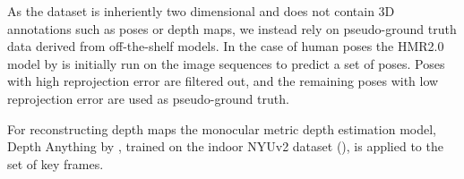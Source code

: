 As the dataset is inheriently two dimensional and does not contain 3D annotations such as poses or depth maps, we instead rely on pseudo-ground truth data derived from off-the-shelf models. In the case of human poses the HMR2.0 model by \cite{goel2023humans} is initially run on the image sequences to predict a set of poses. Poses with high reprojection error are filtered out, and the remaining poses with low reprojection error are used as pseudo-ground truth. 

For reconstructing depth maps the monocular metric depth estimation model, Depth Anything by \cite{depthanything}, trained on the indoor NYUv2 dataset (\cite{SilbermanECCV12}), is applied to the set of key frames.





